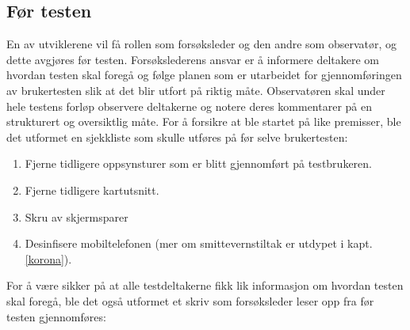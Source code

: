 \subsection{Før testen}
En av utviklerene vil få rollen som forsøksleder og den andre som observatør, og dette avgjøres før testen. Forsøkslederens ansvar er å informere deltakere om hvordan testen skal foregå og følge planen som er utarbeidet for gjennomføringen av brukertesten slik at det blir utfort på riktig måte. Observatøren skal under hele testens forløp observere deltakerne og notere deres kommentarer på en strukturert og oversiktlig måte. For å forsikre at ble startet på like premisser, ble det utformet en sjekkliste som skulle utføres på før selve brukertesten: 
\begin{enumerate}
    \item Fjerne tidligere oppsynsturer som er blitt gjennomført på testbrukeren. 
    \item Fjerne tidligere kartutsnitt.
    \item Skru av skjermsparer
    \item Desinfisere mobiltelefonen (mer om smittevernstiltak er utdypet i kapt. \ref{korona}).
\end{enumerate}
\noindent
For å være sikker på at alle testdeltakerne fikk lik informasjon om hvordan testen skal foregå, ble det også utformet et skriv som forsøksleder leser opp fra før testen gjennomføres: 
